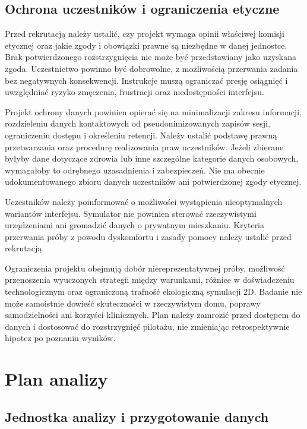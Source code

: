 \documentclass[11pt,a4paper]{article}
\begin{document}
\subsection{Ochrona uczestników i ograniczenia etyczne}

Przed rekrutacją należy ustalić, czy projekt wymaga opinii właściwej komisji etycznej oraz jakie zgody i obowiązki prawne są niezbędne w danej jednostce. Brak potwierdzonego rozstrzygnięcia nie może być przedstawiany jako uzyskana zgoda. Uczestnictwo powinno być dobrowolne, z możliwością przerwania zadania bez negatywnych konsekwencji. Instrukcje muszą ograniczać presję osiągnięć i uwzględniać ryzyko zmęczenia, frustracji oraz niedostępności interfejsu.

Projekt ochrony danych powinien opierać się na minimalizacji zakresu informacji, rozdzieleniu danych kontaktowych od pseudonimizowanych zapisów sesji, ograniczeniu dostępu i określeniu retencji. Należy ustalić podstawę prawną przetwarzania oraz procedurę realizowania praw uczestników. Jeżeli zbierane byłyby dane dotyczące zdrowia lub inne szczególne kategorie danych osobowych, wymagałoby to odrębnego uzasadnienia i zabezpieczeń. Nie ma obecnie udokumentowanego zbioru danych uczestników ani potwierdzonej zgody etycznej.

Uczestników należy poinformować o możliwości wystąpienia nieoptymalnych wariantów interfejsu. Symulator nie powinien sterować rzeczywistymi urządzeniami ani gromadzić danych o prywatnym mieszkaniu. Kryteria przerwania próby z powodu dyskomfortu i zasady pomocy należy ustalić przed rekrutacją.

Ograniczenia projektu obejmują dobór niereprezentatywnej próby, możliwość przenoszenia wyuczonych strategii między warunkami, różnice w doświadczeniu technologicznym oraz ograniczoną trafność ekologiczną symulacji 2D. Badanie nie może samoistnie dowieść skuteczności w rzeczywistym domu, poprawy samodzielności ani korzyści klinicznych. Plan należy zamrozić przed dostępem do danych i dostosować do rozstrzygnięć pilotażu, nie zmieniając retrospektywnie hipotez po poznaniu wyników.

\section{Plan analizy}

\subsection{Jednostka analizy i przygotowanie danych}
\end{document}
